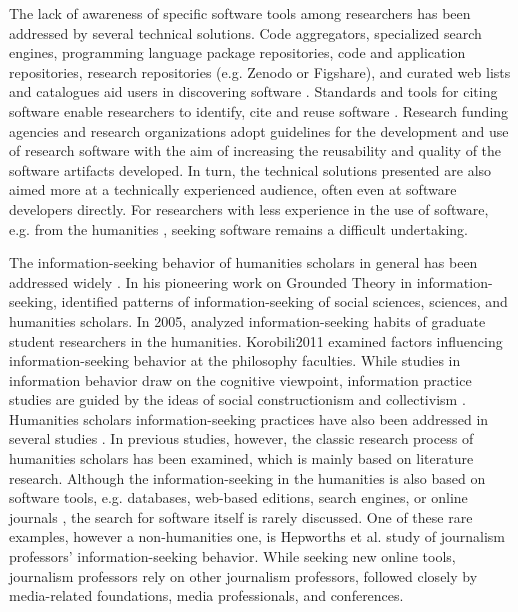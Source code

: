 \documentclass[12pt, a4paper, titlepage, oneside, abstract=true, toc=listof, toc=bibliography]{scrreprt}
\begin{document}
The lack of awareness of specific software tools among researchers has been addressed by several technical solutions. Code aggregators, specialized search engines, programming language package repositories, code and application repositories, research repositories (e.g. Zenodo or Figshare), and curated web lists and catalogues aid users in discovering software \citep{Struck2018}. Standards and tools for citing software enable researchers to identify, cite and reuse software \citep[e.g.]{Niemeyer2016, Smith2016, Soito2017}. Research funding agencies and research organizations \citep[e.g.]{Haupt2018, Katerbow2018, Scheliga2019} adopt guidelines for the development and use of research software with the aim of increasing the reusability and quality of the software artifacts developed. In turn, the technical solutions presented are also aimed more at a technically experienced audience, often even at software developers directly. For researchers with less experience in the use of software, e.g. from the humanities \citep{Rimmer2006}, seeking software remains a difficult undertaking.

The information-seeking behavior of humanities scholars in general has been addressed widely \citep[e.g.]{Barrett2005, Bronstein2007, Bronstein2007a, Catalano2013, Ellis1993, Given2018, Korobili2011, Liew2006, Rimmer2006}. In his pioneering work on Grounded Theory in information-seeking, \citet{Ellis1993} identified patterns of information-seeking of social sciences, sciences, and humanities scholars. In 2005, \citet{Barrett2005} analyzed information-seeking habits of graduate student researchers in the humanities. Korobili{2011} examined factors influencing information-seeking behavior at the philosophy faculties. While studies in information behavior draw on the cognitive viewpoint, information practice studies are guided by the ideas of social constructionism and collectivism \citep{Savolainen2007, Talja2005, Talja2007}. Humanities scholars information-seeking practices have also been addressed in several studies \citep{Benardou2013, Bulger2011, Given2018, Palmer2009}. In previous studies, however, the classic research process of humanities scholars has been examined, which is mainly based on literature research. Although the information-seeking in the humanities is also based on software tools, e.g. databases, web-based editions, search engines, or online journals \citep{Barrett2005, Rimmer2006}, the search for software itself is rarely discussed. One of these rare examples, however a non-humanities one, is Hepworths et al. \citeyearpar{Hepworth2017} study of journalism professors' information-seeking behavior. While seeking new online tools, journalism professors rely on other journalism professors, followed closely by media-related foundations, media professionals, and conferences.
\end{document}
